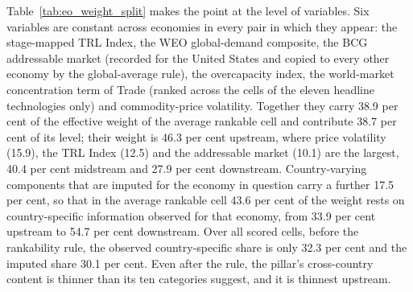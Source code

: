 Table~\ref{tab:eo_weight_split} makes the point at the level of variables. Six variables are
constant across economies in every pair in which they appear: the stage-mapped TRL Index, the WEO
global-demand composite, the BCG addressable market (recorded for the United States and copied to
every other economy by the global-average rule), the overcapacity index, the world-market
concentration term of Trade (ranked across the cells of the eleven headline technologies only) and
commodity-price volatility. Together they carry 38.9 per cent of the effective weight of the
average rankable cell and contribute 38.7 per cent of its level; their weight is 46.3 per cent
upstream, where price volatility (15.9), the TRL Index (12.5) and the addressable market (10.1)
are the largest, 40.4 per cent midstream and 27.9 per cent downstream. Country-varying components
that are imputed for the economy in question carry a further 17.5 per cent, so that in the average
rankable cell 43.6 per cent of the weight rests on country-specific information observed for that
economy, from 33.9 per cent upstream to 54.7 per cent downstream. Over all scored cells, before the
rankability rule, the observed country-specific share is only 32.3 per cent and the imputed share
30.1 per cent. Even after the rule, the pillar's cross-country content is thinner than its ten
categories suggest, and it is thinnest upstream.



